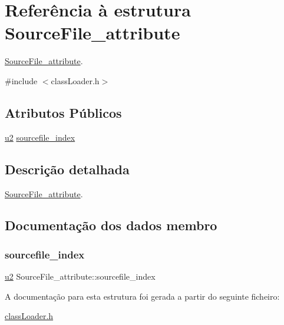 \hypertarget{struct_source_file__attribute}{}\section{Referência à estrutura Source\+File\+\_\+attribute}
\label{struct_source_file__attribute}


\hyperlink{struct_source_file__attribute}{Source\+File\+\_\+attribute}.  




{\ttfamily \#include $<$class\+Loader.\+h$>$}

\subsection*{Atributos Públicos}
\begin{DoxyCompactItemize}
\item 
\hyperlink{util_8h_a55ef8d87fd202b8417704c089899c5b9}{u2} \hyperlink{struct_source_file__attribute_a13cba4fc8896792aad81ab821c3244ca}{sourcefile\+\_\+index}
\end{DoxyCompactItemize}


\subsection{Descrição detalhada}
\hyperlink{struct_source_file__attribute}{Source\+File\+\_\+attribute}. 

\subsection{Documentação dos dados membro}
\mbox{\label{struct_source_file__attribute_a13cba4fc8896792aad81ab821c3244ca}} 
\subsubsection{\texorpdfstring{sourcefile\+\_\+index}{sourcefile\_index}}
{\footnotesize\ttfamily \hyperlink{util_8h_a55ef8d87fd202b8417704c089899c5b9}{u2} Source\+File\+\_\+attribute\+::sourcefile\+\_\+index}



A documentação para esta estrutura foi gerada a partir do seguinte ficheiro\+:\begin{DoxyCompactItemize}
\item 
\hyperlink{class_loader_8h}{class\+Loader.\+h}\end{DoxyCompactItemize}
